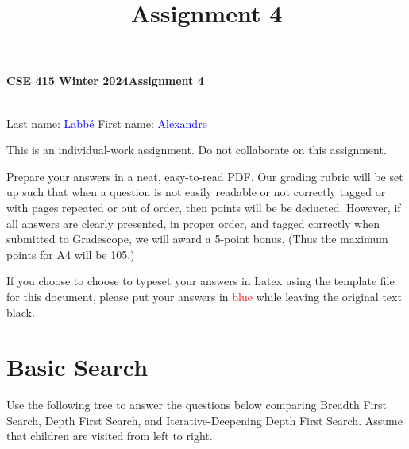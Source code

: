 \documentclass[12pt]{article}
\title{Assignment 4}
\begin{document}
\pagestyle{fancy}
\fancyhead{}
\renewcommand{\headrulewidth}{0pt} %
\fancyfoot{}
\fancyfoot[R]{\thepage}

{\huge \bf CSE 415 Winter 2024\hfill Assignment 4}  \\
\vspace{0.2cm}

{\textcolor{blue}{}}\\

Last name: {\textcolor{blue}{Labbé}} \hspace{1cm} First name: {\textcolor{blue}{Alexandre}} \hfill  \\
\vspace{0.2cm}

This is an individual-work assignment. Do not collaborate on
this assignment.

Prepare your answers in a neat, easy-to-read
PDF. Our grading rubric will be set up such that
when a question is not easily readable
or not correctly tagged or with pages repeated or
out of order, then points will be
be deducted.  However, if all answers are
clearly presented, in proper order, and
tagged correctly when submitted to Gradescope,
we will award a 5-point bonus. (Thus the maximum points for A4 will be 105.)

If you choose to choose to typeset your answers
in Latex using the template file for this document,
please put your answers in \textcolor{red}{blue} while
leaving the original text black.

\hrulefill
\vspace{0.2cm}
\newpage
\section{Basic Search}

Use the following tree to answer the questions below comparing Breadth First Search, Depth First Search, and Iterative-Deepening Depth First Search. Assume that children are visited from left to right.
\end{document}
